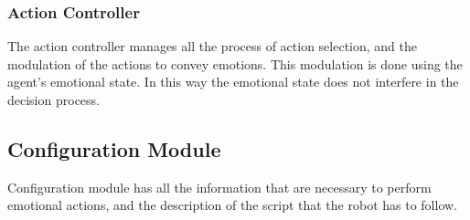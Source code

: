 \subsubsection{Action Controller}
The action controller manages all the process of action selection, and the modulation of the actions to convey emotions. This modulation is done using the agent's emotional state. In this way the emotional state does not interfere in the decision process.
\subsection{Configuration Module}
Configuration module has all the information that are necessary to perform emotional actions, and the description of the script that the robot has to follow.
